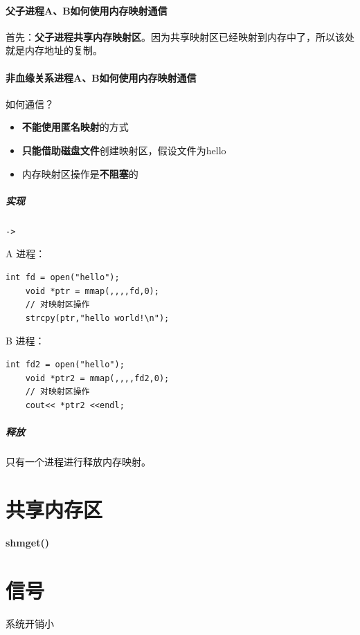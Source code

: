 \documentclass[UTF8,a4paper,12pt]{ctexbook}
\begin{document}
		
		\paragraph{父子进程A、B如何使用内存映射通信}
			
			首先：\textbf{父子进程共享内存映射区}。因为共享映射区已经映射到内存中了，所以该处就是内存地址的复制。
						
		\paragraph{非血缘关系进程A、B如何使用内存映射通信}
			如何通信？
				\begin{itemize}[itemindent = 1em]
					\item \textbf{不能使用匿名映射}的方式
					\item \textbf{只能借助磁盘文件}创建映射区，假设文件为hello
					\item 内存映射区操作是\textbf{不阻塞}的
				\end{itemize}
				
				\subparagraph{实现}\verb|->|
				
					A 进程：
					\begin{lstlisting}[frame = L, xleftmargin = .1\textwidth]
	int fd = open("hello");
	void *ptr = mmap(,,,,fd,0);
	// 对映射区操作
	strcpy(ptr,"hello world!\n");
					\end{lstlisting}
					
					B 进程：
					\begin{lstlisting}[frame = L, xleftmargin = .1\textwidth]
	int fd2 = open("hello");
	void *ptr2 = mmap(,,,,fd2,0);
	// 对映射区操作
	cout<< *ptr2 <<endl;
					\end{lstlisting}
					
				\subparagraph{释放} 只有一个进程进行释放内存映射。
			
	\section{共享内存区}	
		\paragraph{shmget()}
	
	\section{信号}系统开销小
\end{document}
